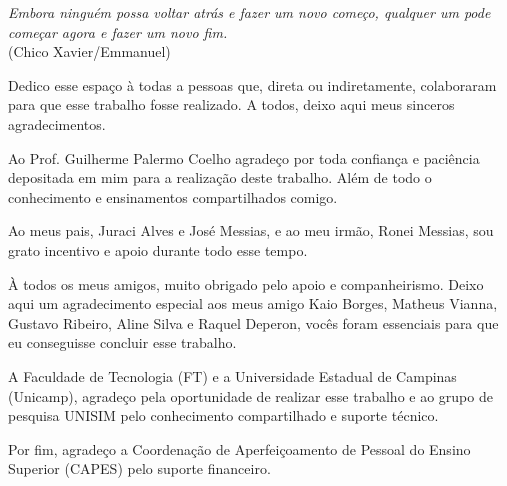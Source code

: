 \documentclass[Portugues,Final]{tese-FT}
\begin{document}
        \paginasiniciais
        
         \begin{epigrafe}
        {\it
                Embora ninguém possa voltar atrás e fazer um novo começo, 
                qualquer um pode começar agora e fazer um novo fim.\\
        }
        \hfill (Chico Xavier/Emmanuel)
        \end{epigrafe}
        Dedico esse espaço à todas a pessoas que, direta ou indiretamente, colaboraram para que esse trabalho fosse realizado. A todos, deixo aqui meus sinceros agradecimentos.
        \newline
        \par
        Ao Prof. Guilherme Palermo Coelho agradeço por toda confiança e paciência depositada em mim para a realização deste trabalho. Além de todo o conhecimento e ensinamentos compartilhados comigo.
        \newline
        \par
        Ao meus pais, Juraci Alves e José Messias, e ao meu irmão, Ronei Messias, sou grato incentivo e apoio durante todo esse tempo.
        \newline
        \par
        À todos os meus amigos, muito obrigado pelo apoio e companheirismo. Deixo aqui um agradecimento especial aos meus amigo Kaio Borges, Matheus Vianna, Gustavo Ribeiro, Aline Silva e Raquel Deperon, vocês foram essenciais para que eu conseguisse concluir esse trabalho.
        \newline
        \par
        A Faculdade de Tecnologia (FT) e a Universidade Estadual de Campinas (Unicamp), agradeço pela oportunidade de realizar esse trabalho e ao grupo de pesquisa UNISIM pelo conhecimento compartilhado e suporte técnico.
        \newline
        \par
        Por fim, agradeço a Coordenação de Aperfeiçoamento de Pessoal do Ensino Superior (CAPES) pelo suporte financeiro.
\end{document}
